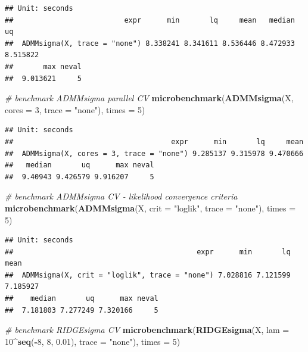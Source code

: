 \documentclass[11pt,]{book}
\newenvironment{Shaded}{\begin{snugshade}}{\end{snugshade}}
\newcommand{\CommentTok}[1]{\textcolor[rgb]{0.56,0.35,0.01}{\textit{#1}}}
\newcommand{\DataTypeTok}[1]{\textcolor[rgb]{0.13,0.29,0.53}{#1}}
\newcommand{\DecValTok}[1]{\textcolor[rgb]{0.00,0.00,0.81}{#1}}
\newcommand{\FloatTok}[1]{\textcolor[rgb]{0.00,0.00,0.81}{#1}}
\newcommand{\KeywordTok}[1]{\textcolor[rgb]{0.13,0.29,0.53}{\textbf{#1}}}
\newcommand{\NormalTok}[1]{#1}
\newcommand{\OperatorTok}[1]{\textcolor[rgb]{0.81,0.36,0.00}{\textbf{#1}}}
\newcommand{\StringTok}[1]{\textcolor[rgb]{0.31,0.60,0.02}{#1}}
\theoremstyle{definition}
\theoremstyle{definition}
\theoremstyle{definition}
\theoremstyle{remark}
\begin{document}
\begin{verbatim}
## Unit: seconds
##                          expr      min       lq     mean   median       uq
##  ADMMsigma(X, trace = "none") 8.338241 8.341611 8.536446 8.472933 8.515822
##       max neval
##  9.013621     5
\end{verbatim}

\begin{Shaded}
\begin{Highlighting}[]
\CommentTok{# benchmark ADMMsigma parallel CV}
\KeywordTok{microbenchmark}\NormalTok{(}\KeywordTok{ADMMsigma}\NormalTok{(X, }\DataTypeTok{cores =} \DecValTok{3}\NormalTok{, }\DataTypeTok{trace =} \StringTok{"none"}\NormalTok{), }\DataTypeTok{times =} \DecValTok{5}\NormalTok{)}
\end{Highlighting}
\end{Shaded}

\begin{verbatim}
## Unit: seconds
##                                     expr      min       lq     mean
##  ADMMsigma(X, cores = 3, trace = "none") 9.285137 9.315978 9.470666
##   median       uq      max neval
##  9.40943 9.426579 9.916207     5
\end{verbatim}

\begin{Shaded}
\begin{Highlighting}[]
\CommentTok{# benchmark ADMMsigma CV - likelihood convergence criteria}
\KeywordTok{microbenchmark}\NormalTok{(}\KeywordTok{ADMMsigma}\NormalTok{(X, }\DataTypeTok{crit =} \StringTok{"loglik"}\NormalTok{, }\DataTypeTok{trace =} \StringTok{"none"}\NormalTok{), }\DataTypeTok{times =} \DecValTok{5}\NormalTok{)}
\end{Highlighting}
\end{Shaded}

\begin{verbatim}
## Unit: seconds
##                                           expr      min       lq     mean
##  ADMMsigma(X, crit = "loglik", trace = "none") 7.028816 7.121599 7.185927
##    median       uq      max neval
##  7.181803 7.277249 7.320166     5
\end{verbatim}

\begin{Shaded}
\begin{Highlighting}[]
\CommentTok{# benchmark RIDGEsigma CV}
\KeywordTok{microbenchmark}\NormalTok{(}\KeywordTok{RIDGEsigma}\NormalTok{(X, }\DataTypeTok{lam =} \DecValTok{10}\OperatorTok{^}\KeywordTok{seq}\NormalTok{(}\OperatorTok{-}\DecValTok{8}\NormalTok{, }\DecValTok{8}\NormalTok{, }\FloatTok{0.01}\NormalTok{), }\DataTypeTok{trace =} \StringTok{"none"}\NormalTok{), }\DataTypeTok{times =} \DecValTok{5}\NormalTok{)}
\end{Highlighting}
\end{Shaded}
\end{document}
